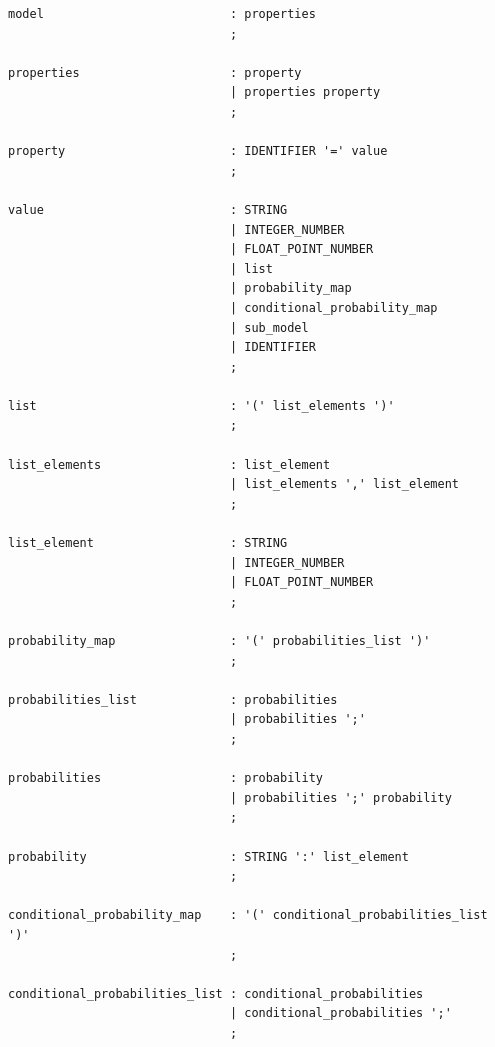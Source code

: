 \begin{lstlisting}[frame=trbl]
model                          : properties
                               ;
                               
properties                     : property
                               | properties property
                               ;
                               
property                       : IDENTIFIER '=' value
                               ;
                               
value                          : STRING
                               | INTEGER_NUMBER
                               | FLOAT_POINT_NUMBER
                               | list
                               | probability_map
                               | conditional_probability_map
                               | sub_model
                               | IDENTIFIER
                               ;
                               
list                           : '(' list_elements ')'
                               ;
                               
list_elements                  : list_element
                               | list_elements ',' list_element
                               ;
                               
list_element                   : STRING
                               | INTEGER_NUMBER
                               | FLOAT_POINT_NUMBER
                               ;
                               
probability_map                : '(' probabilities_list ')'
                               ;
                               
probabilities_list             : probabilities
                               | probabilities ';'
                               ;
                               
probabilities                  : probability
                               | probabilities ';' probability
                               ;
                               
probability                    : STRING ':' list_element
                               ;

conditional_probability_map    : '(' conditional_probabilities_list ')'
                               ;

conditional_probabilities_list : conditional_probabilities
                               | conditional_probabilities ';'
                               ;


\end{lstlisting}
